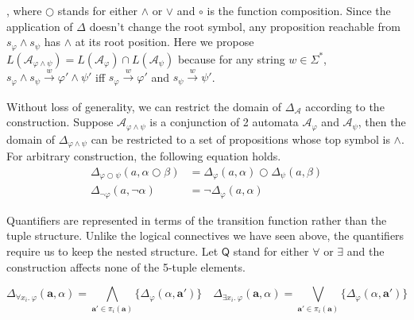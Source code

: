 \begin{prooftree}
\end{prooftree}

, where \( \bigcirc \) stands for either \( \wedge \) or \( \vee \) and \( \circ
\) is the function composition. Since the application of \( \Delta \) doesn't
change the root symbol, any proposition reachable from \(s_\varphi \wedge s_\psi
\) has \( \wedge \) at its root position. Here we propose \(
L(\mathcal{A}_{\varphi \wedge \psi}) = L(\mathcal{A}_{\varphi}) \cap
L(\mathcal{A}_{\psi}) \) because for any string \( w \in \Sigma^* \), \(
s_\varphi \wedge s_\psi \xrightarrow[]w \varphi' \wedge \psi' \) iff \(
s_\varphi \xrightarrow[]w \varphi' \) and \( s_\psi \xrightarrow[]w \psi' \).

Without loss of generality, we can restrict the domain of \(
\Delta_{\mathcal{A}} \) according to the construction. Suppose \(
\mathcal{A}_{\varphi \wedge \psi} \) is a conjunction of 2 automata \(
\mathcal{A}_{\varphi} \) and \( \mathcal{A}_{\psi} \), then the domain of \(
\Delta_{\varphi \wedge \psi} \) can be restricted to a set of propositions whose
top symbol is \( \wedge \). For arbitrary construction, the following equation
holds.
\begin{align*}
  \Delta_{\varphi \bigcirc \psi}(a, \alpha \bigcirc \beta) &=
  \Delta_\varphi(a, \alpha) \bigcirc \Delta_\psi(a, \beta) \\
  \Delta_{\neg \varphi}(a, \neg \alpha) &= \neg \Delta_\varphi(a, \alpha)
\end{align*}

Quantifiers are represented in terms of the transition function rather than the
tuple structure. Unlike the logical connectives we have seen above, the
quantifiers require us to keep the nested structure. Let \( \mathsf{Q} \) stand
for either \( \forall \) or \( \exists \) and the construction affects none of
the 5-tuple elements.

\[
\Delta_{\forall x_i .\ \varphi}(\mathbf{a}, \alpha) =
\bigwedge\limits_{\mathbf{a}' \in \pi_i(\mathbf{a})} 
\{ \Delta_{\varphi}(\alpha, \mathbf{a}') \}
\quad
\Delta_{\exists x_i .\ \varphi}(\mathbf{a}, \alpha) = 
\bigvee  \limits_{\mathbf{a}' \in \pi_i(\mathbf{a})} 
\{ \Delta_{\varphi}(\alpha, \mathbf{a}') \}
\]

